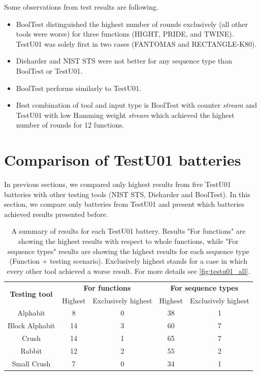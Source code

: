 \documentclass[
    digital,    %
    oneside,    %
    color,
    11pt,
    nocover,
    notable,
    nolof,
    nolot,
    final
]{fithesis3}
\renewcommand\_{\textunderscore\allowbreak}
\begin{document}
Some observations from test results are following. 

\begin{itemize}
	\item BoolTest distinguished the highest number of rounds exclusively (all other tools were worse) for three functions (HIGHT, PRIDE, and TWINE). TestU01 was solely first in two cases (FANTOMAS and RECTANGLE-K80).
	\item Dieharder and NIST STS were not better for any sequence type than BoolTest or TestU01.
	\item BoolTest performs similarly to TestU01. 
	\item Best combination of tool and input type is BoolTest with counter \textit{stream} and TestU01 with low Hamming weight \textit{stream} which achieved the highest number of rounds for 12 functions.
\end{itemize}

\section{Comparison of TestU01 batteries}
\label{sec:results of testu01}

In previous sections, we compared only highest results from five TestU01 batteries with other testing tools (NIST STS, Dieharder and BoolTest). In this section, we compare only batteries from TestU01 and present which batteries achieved results presented before.

\begin{table}[htbp]
	\centering
	\begin{tabular}{|c|c|c|c|c|}
		\hline
		\multirow{2}{*}{\textbf{\large Testing tool}} & \multicolumn{2}{c|}{\textbf{\large For functions}} & \multicolumn{2}{c|}{\textbf{\large For sequence types}} \\ \cline{2-5}
		& Highest & Exclusively highest & Highest & Exclusively highest \\ \hline
		Alphabit & 8 & 0 & 38 & 1 \\
		Block Alphabit & 14 & 3 & 60 & 7 \\
		Crush & 14 & 1 & 65 & 7 \\
		Rabbit & 12 & 2 &  55 & 2 \\ 
		Small Crush & 7 & 0 &  34 & 1 \\ \hline
		
		
	\end{tabular}
	\caption{A summary of results for each TestU01 battery. Results "For functions" are showing the highest results with respect to whole functions, while "For sequence types" results are showing the highest results for each sequence type (Function + testing scenario). Exclusively highest stands for a case in which every other tool achieved a worse result. For more details see \cref{fig:testu01_all}.}
	\label{table:testu01_summary_results}
\end{table}
\end{document}
